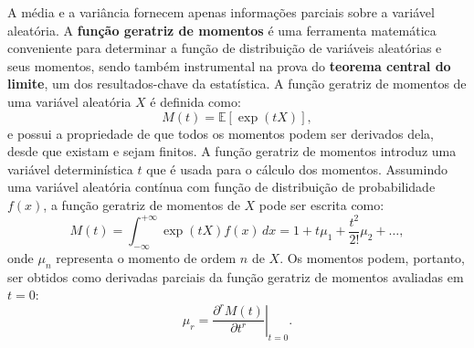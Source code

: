 A média e a variância fornecem apenas informações parciais sobre a variável aleatória. A \textbf{função geratriz de momentos} é uma ferramenta matemática conveniente para determinar a função de distribuição de variáveis aleatórias e seus momentos, sendo também instrumental na prova do \textbf{teorema central do limite}, um dos resultados-chave da estatística. A função geratriz de momentos de uma variável aleatória $X$ é definida como:
\begin{equation}
M(t) = \mathbb{E}[\exp{\left(tX\right)}],
\end{equation}
e possui a propriedade de que todos os momentos podem ser derivados dela, desde que existam e sejam finitos. A função geratriz de momentos introduz uma variável determinística $t$ que é usada para o cálculo dos momentos. Assumindo uma variável aleatória contínua com função de distribuição de probabilidade $ f(x) $, a função geratriz de momentos de $ X $ pode ser escrita como:
\begin{equation*}
M(t) = \int_{-\infty}^{+\infty} \exp{\left(tX\right)} f(x)\,dx = 1 + t\mu_1 + \dfrac{t^2}{2!}\mu_2 + \ldots,
\end{equation*}
onde $ \mu_n $ representa o momento de ordem $ n $ de $ X $. Os momentos podem, portanto, ser obtidos como derivadas parciais da função geratriz de momentos avaliadas em $ t = 0 $:
\begin{equation}
\mu_r = \left. \dfrac{\partial^r M(t)}{\partial t^r} \right|_{t=0}.
\end{equation}

